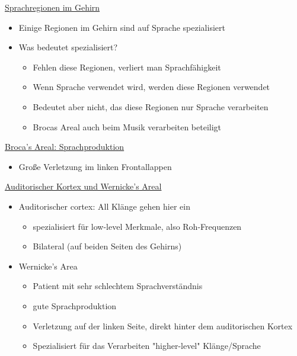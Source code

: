 \documentclass[a4paper,10pt,oneside]{article}
\begin{document}
\underline{Sprachregionen im Gehirn} \\
	\begin{itemize}
		\item Einige Regionen im Gehirn sind auf Sprache spezialisiert
		\item Was bedeutet spezialisiert?
			\begin{itemize}
				\item Fehlen diese Regionen, verliert man Sprachfähigkeit
				\item Wenn Sprache verwendet wird, werden diese Regionen verwendet
				\item Bedeutet aber nicht, das diese Regionen nur Sprache verarbeiten
				\item Brocas Areal auch beim Musik verarbeiten beteiligt
			\end{itemize}
	\end{itemize}

\underline{Broca's Areal: Sprachproduktion} \\
	\begin{itemize}
		\item Große Verletzung im linken Frontallappen
	\end{itemize}
	
\underline{Auditorischer Kortex und Wernicke's Areal} \\
	\begin{itemize}
		\item Auditorischer cortex: All Klänge gehen hier ein
			\begin{itemize}
				\item spezialisiert für low-level Merkmale, also Roh-Frequenzen
				\item Bilateral (auf beiden Seiten des Gehirns)
			\end{itemize}
		\item Wernicke's Area
			\begin{itemize}
				\item Patient mit sehr schlechtem Sprachverständnis
				\item gute Sprachproduktion
				\item Verletzung auf der linken Seite, direkt hinter dem auditorischen Kortex
				\item Spezialisiert für das Verarbeiten "higher-level" Klänge/Sprache
			\end{itemize}
	\end{itemize}
\end{document}
